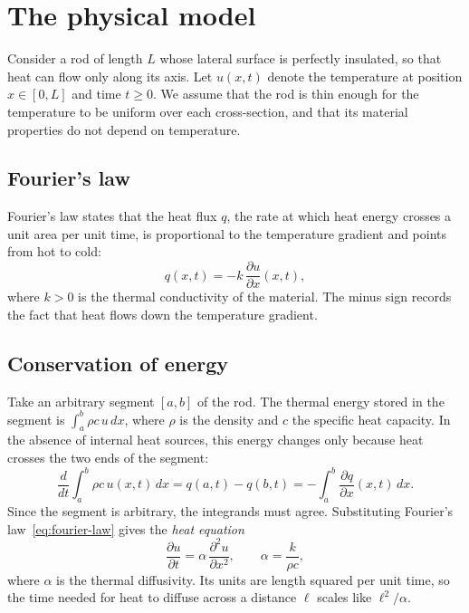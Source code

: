 \documentclass[11pt]{article}
\theoremstyle{definition}
\theoremstyle{remark}
\begin{document}
\section{The physical model}\label{sec:model}

Consider a rod of length $L$ whose lateral surface is perfectly insulated, so that heat can flow only along its axis. Let $u(x,t)$ denote the temperature at position $x \in [0, L]$ and time $t \ge 0$. We assume that the rod is thin enough for the temperature to be uniform over each cross-section, and that its material properties do not depend on temperature.

\subsection{Fourier's law}

Fourier's law states that the heat flux $q$, the rate at which heat energy crosses a unit area per unit time, is proportional to the temperature gradient and points from hot to cold:
\begin{equation}\label{eq:fourier-law}
  q(x,t) = -k \, \frac{\partial u}{\partial x}(x,t),
\end{equation}
where $k > 0$ is the thermal conductivity of the material. The minus sign records the fact that heat flows down the temperature gradient.

\subsection{Conservation of energy}

Take an arbitrary segment $[a, b]$ of the rod. The thermal energy stored in the segment is $\int_a^b \rho c \, u \, dx$, where $\rho$ is the density and $c$ the specific heat capacity. In the absence of internal heat sources, this energy changes only because heat crosses the two ends of the segment:
\begin{equation}
  \frac{d}{dt} \int_a^b \rho c \, u(x,t) \, dx = q(a,t) - q(b,t) = -\int_a^b \frac{\partial q}{\partial x}(x,t) \, dx .
\end{equation}
Since the segment is arbitrary, the integrands must agree. Substituting Fourier's law~\eqref{eq:fourier-law} gives the \emph{heat equation}
\begin{equation}\label{eq:heat}
  \frac{\partial u}{\partial t} = \alpha \, \frac{\partial^2 u}{\partial x^2},
  \qquad \alpha = \frac{k}{\rho c},
\end{equation}
where $\alpha$ is the thermal diffusivity. Its units are length squared per unit time, so the time needed for heat to diffuse across a distance $\ell$ scales like $\ell^2 / \alpha$.
\end{document}
